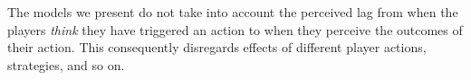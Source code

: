 The models 
we present do not take into account the perceived lag from when the 
players \textit{think} they have triggered an action to when they 
perceive the outcomes of their action. This consequently disregards 
effects of different player actions, strategies, and so on.



















